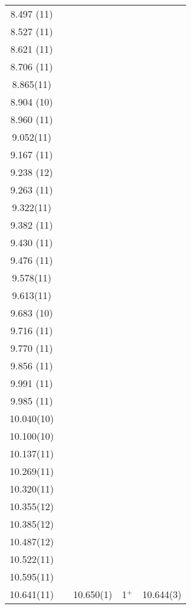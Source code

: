 \begin{center}
\begin{longtable}{cc cc c}
  8.497 (11)    &   &   &   &   \\
  8.527 (11)    &   &   &   &   \\
  8.621 (11)    &   &   &   &   \\
  8.706 (11)    &   &   &   &   \\
   8.865(11)    &   &   &   &   \\
  8.904 (10)    &   &   &   &   \\
  8.960 (11)    &   &   &   &   \\
   9.052(11)    &   &   &   &   \\
  9.167 (11)    &   &   &   &   \\
  9.238 (12)    &   &   &   &   \\
  9.263 (11)    &   &   &   &   \\
   9.322(11)    &   &   &   &   \\
  9.382 (11)    &   &   &   &   \\
  9.430 (11)    &   &   &   &   \\
  9.476 (11)    &   &   &   &   \\
   9.578(11)    &   &   &   &   \\
   9.613(11)    &   &   &   &   \\
  9.683 (10)    &   &   &   &   \\
  9.716 (11)    &   &   &   &   \\
  9.770 (11)    &   &   &   &   \\
  9.856 (11)    &   &   &   &   \\
  9.991 (11)    &   &   &   &   \\
  9.985 (11)    &   &   &   &   \\
  10.040(10)    &   &   &   &   \\
  10.100(10)    &   &   &   &   \\
  10.137(11)    &   &   &   &   \\
  10.269(11)    &   &   &   &   \\
  10.320(11)    &   &   &   &   \\
  10.355(12)    &   &   &   &   \\
  10.385(12)    &   &   &   &   \\
  10.487(12)    &   &   &   &   \\
  10.522(11)    &   &   &   &   \\
  10.595(11)    &   &   &   &   \\
     10.641(11)   &   & 10.650(1)   &            1$^+$              &    10.644(3)  \\

\end{longtable}
\end{center}
